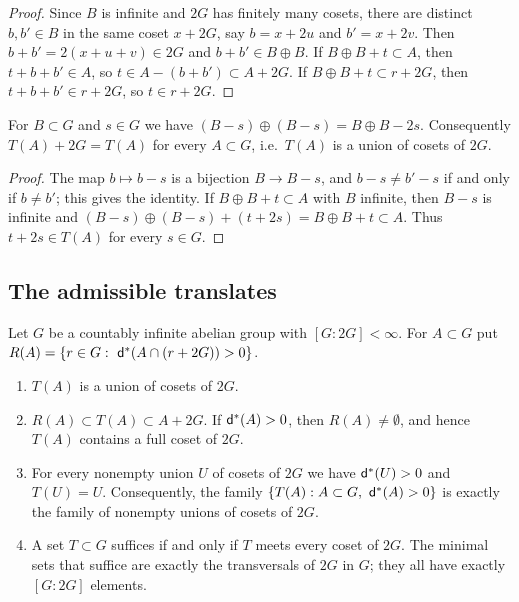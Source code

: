 \begin{proof}
Since $B$ is infinite and $2G$ has finitely many cosets, there are distinct $b,b'\in B$ in
the same coset $x+2G$, say $b=x+2u$ and $b'=x+2v$. Then $b+b'=2(x+u+v)\in2G$ and
$b+b'\in B\oplus B$. If $B\oplus B+t\subset A$, then $t+b+b'\in A$, so
$t\in A-(b+b')\subset A+2G$. If $B\oplus B+t\subset r+2G$, then $t+b+b'\in r+2G$, so
$t\in r+2G$.
\end{proof}

\begin{lemma}\label{G:lem:move}
For $B\subset G$ and $s\in G$ we have $(B-s)\oplus(B-s)=B\oplus B-2s$. Consequently
$T(A)+2G=T(A)$ for every $A\subset G$, i.e.\ $T(A)$ is a union of cosets of $2G$.
\end{lemma}

\begin{proof}
The map $b\mapsto b-s$ is a bijection $B\to B-s$, and $b-s\neq b'-s$ if and only if
$b\neq b'$; this gives the identity. If $B\oplus B+t\subset A$ with $B$ infinite, then
$B-s$ is infinite and $(B-s)\oplus(B-s)+(t+2s)=B\oplus B+t\subset A$. Thus
$t+2s\in T(A)$ for every $s\in G$.
\end{proof}

\subsection{The admissible translates}

\begin{theorem}\label{G:thm:translates}
Let $G$ be a countably infinite abelian group with $[G:2G]<\infty$. For $A\subset G$ put
$R(A)=\{r\in G:\ \ubd(A\cap(r+2G))>0\}$.
\begin{enumerate}[label=\textup{(\alph*)}]
\item\label{G:it:union} $T(A)$ is a union of cosets of $2G$.
\item\label{G:it:sandwich} $R(A)\subset T(A)\subset A+2G$. If $\mathsf{d}^*(A)>0$, then
$R(A)\neq\emptyset$, and hence $T(A)$ contains a full coset of $2G$.
\item\label{G:it:realise} For every nonempty union $U$ of cosets of $2G$ we have
$\mathsf{d}^*(U)>0$ and $T(U)=U$. Consequently, the family
$\{T(A):A\subset G,\ \ubd(A)>0\}$ is exactly the family of nonempty unions of cosets of
$2G$.
\item\label{G:it:suffice} A set $T\subset G$ suffices if and only if $T$ meets every coset of
$2G$. The minimal sets that suffice are exactly the transversals of $2G$ in $G$; they all
have exactly $[G:2G]$ elements.
\end{enumerate}
\end{theorem}

